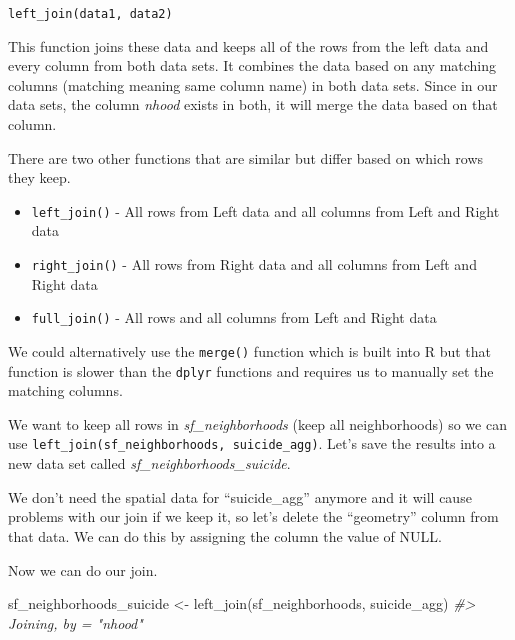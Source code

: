 \documentclass[
]{krantz}
\makeatletter
\newenvironment{Shaded}{\begin{snugshade}}{\end{snugshade}}
\newcommand{\CommentTok}[1]{\textcolor[rgb]{0.37,0.37,0.37}{\textit{#1}}}
\newcommand{\ConstantTok}[1]{\textcolor[rgb]{0,0,0}{#1}}
\newcommand{\FunctionTok}[1]{\textcolor[rgb]{0,0,0}{#1}}
\newcommand{\NormalTok}[1]{#1}
\newcommand{\OtherTok}[1]{\textcolor[rgb]{0.37,0.37,0.37}{#1}}
\newcommand{\SpecialCharTok}[1]{\textcolor[rgb]{0,0,0}{#1}}
\providecommand{\tightlist}{%
  \setlength{\itemsep}{0pt}\setlength{\parskip}{0pt}}
\newenvironment{kframe}{%
\medskip{}
\setlength{\fboxsep}{.8em}
 \def\at@end@of@kframe{}%
 \ifinner\ifhmode%
  \def\at@end@of@kframe{\end{minipage}}%
  \begin{minipage}{\columnwidth}%
 \fi\fi%
 \def\FrameCommand##1{\hskip\@totalleftmargin \hskip-\fboxsep
 \colorbox{shadecolor}{##1}\hskip-\fboxsep
     \hskip-\linewidth \hskip-\@totalleftmargin \hskip\columnwidth}%
 \MakeFramed {\advance\hsize-\width
   \@totalleftmargin\z@ \linewidth\hsize
   \@setminipage}}%
 {\par\unskip\endMakeFramed%
 \at@end@of@kframe}
\renewenvironment{Shaded}{\begin{kframe}}{\end{kframe}}
\makeatother
\begin{document}
\texttt{left\_join(data1,\ data2)}

This function joins these data and keeps all of the rows from the left data and every column from both data sets. It combines the data based on any matching columns (matching meaning same column name) in both data sets. Since in our data sets, the column \emph{nhood} exists in both, it will merge the data based on that column.

There are two other functions that are similar but differ based on which rows they keep.

\begin{itemize}
\tightlist
\item
  \texttt{left\_join()} - All rows from Left data and all columns from Left and Right data
\item
  \texttt{right\_join()} - All rows from Right data and all columns from Left and Right data
\item
  \texttt{full\_join()} - All rows and all columns from Left and Right data
\end{itemize}

We could alternatively use the \texttt{merge()} function which is built into R but that function is slower than the \texttt{dplyr} functions and requires us to manually set the matching columns.

We want to keep all rows in \emph{sf\_neighborhoods} (keep all neighborhoods) so we can use \texttt{left\_join(sf\_neighborhoods,\ suicide\_agg)}. Let's save the results into a new data set called \emph{sf\_neighborhoods\_suicide}.

We don't need the spatial data for ``suicide\_agg'' anymore and it will cause problems with our join if we keep it, so let's delete the ``geometry'' column from that data. We can do this by assigning the column the value of NULL.

\begin{Shaded}
\end{Shaded}

Now we can do our join.

\begin{Shaded}
\begin{Highlighting}[]
\NormalTok{sf\_neighborhoods\_suicide }\OtherTok{\textless{}{-}} \FunctionTok{left\_join}\NormalTok{(sf\_neighborhoods, suicide\_agg)}
\CommentTok{\#\textgreater{} Joining, by = "nhood"}
\end{Highlighting}
\end{Shaded}
\end{document}
